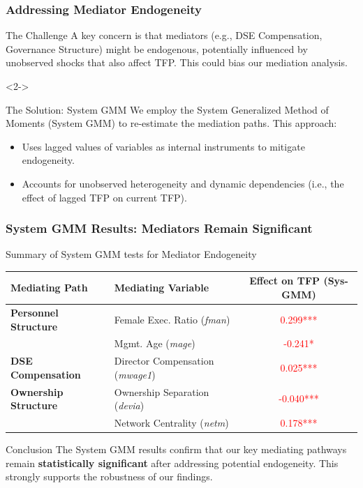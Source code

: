 \documentclass[aspectratio=169]{beamer}
\begin{document}
\begin{frame}
    \frametitle{Addressing Mediator Endogeneity}
    \begin{block}{The Challenge}
    A key concern is that mediators (e.g., DSE Compensation, Governance Structure) might be endogenous, potentially influenced by unobserved shocks that also affect TFP. This could bias our mediation analysis.
    \end{block}
    <2->
    \begin{alertblock}{The Solution: System GMM}
    We employ the System Generalized Method of Moments (System GMM) to re-estimate the mediation paths. This approach:
    \begin{itemize}
        \item Uses lagged values of variables as internal instruments to mitigate endogeneity.
        \item Accounts for unobserved heterogeneity and dynamic dependencies (i.e., the effect of lagged TFP on current TFP).
    \end{itemize}
    \end{alertblock}
\end{frame}

\begin{frame}[fragile]
    \frametitle{System GMM Results: Mediators Remain Significant}
    \begin{block}{Summary of System GMM tests for Mediator Endogeneity}
    \centering
    \begin{tabular}{l l c}
    \toprule
    \textbf{Mediating Path} & \textbf{Mediating Variable} & \textbf{Effect on TFP (Sys-GMM)} \\
    \midrule
    \textbf{Personnel Structure} & Female Exec. Ratio (\textit{fman}) & \textcolor{red}{0.299***} \\
                                 & Mgmt. Age (\textit{mage}) & \textcolor{red}{-0.241*} \\
    \addlinespace
    \textbf{DSE Compensation} & Director Compensation (\textit{mwage1}) & \textcolor{red}{0.025***} \\
    \addlinespace
    \textbf{Ownership Structure} & Ownership Separation (\textit{devia}) & \textcolor{red}{-0.040***} \\
                                 & Network Centrality (\textit{netm}) & \textcolor{red}{0.178***} \\
    \bottomrule
    \end{tabular}
    \end{block}
    \vfill
    \begin{alertblock}{Conclusion}
    The System GMM results confirm that our key mediating pathways remain \textbf{statistically significant} after addressing potential endogeneity. This strongly supports the robustness of our findings.
    \end{alertblock}
\end{frame}
\end{document}
